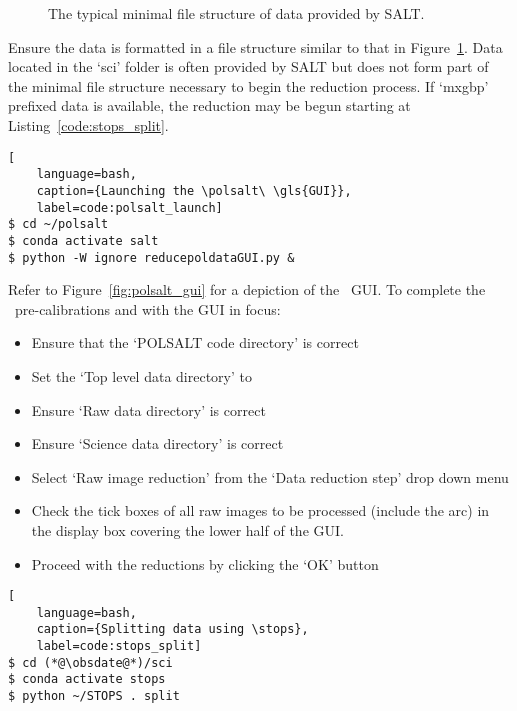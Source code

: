 \begin{figure}[h!]
    \centering
    \begin{minipage}{8cm}
    \end{minipage}
    \caption{The typical minimal file structure of data provided by \gls{SALT}.}
    \label{dir:pre_red}
\end{figure}

Ensure the data is formatted in a file structure similar to that in Figure~\ref{dir:pre_red}. Data located in the `sci' folder is often provided by \gls{SALT} but does not form part of the minimal file structure necessary to begin the reduction process. If `mxgbp' prefixed data is available, the reduction may be begun starting at Listing~\ref{code:stops_split}.

\begin{lstlisting}[
    language=bash,
    caption={Launching the \polsalt\ \gls{GUI}},
    label=code:polsalt_launch]
$ cd ~/polsalt
$ conda activate salt
$ python -W ignore reducepoldataGUI.py &
\end{lstlisting}

\noindent Refer to Figure~\ref{fig:polsalt_gui} for a depiction of the \polsalt\ \gls{GUI}. To complete the \polsalt\ pre-calibrations and with the \gls{GUI} in focus:
\begin{itemize}
    \item Ensure that the `POLSALT code directory' is correct
    \item Set the `Top level data directory' to \obsdate
    \item Ensure `Raw data directory' is correct
    \item Ensure `Science data directory' is correct
    \item Select `Raw image reduction' from the `Data reduction step' drop down menu
    \item Check the tick boxes of all raw images to be processed (include the arc) in the display box covering the lower half of the \gls{GUI}.
    \item Proceed with the reductions by clicking the `OK' button
\end{itemize}

\begin{lstlisting}[
    language=bash,
    caption={Splitting data using \stops},
    label=code:stops_split]
$ cd (*@\obsdate@*)/sci
$ conda activate stops
$ python ~/STOPS . split
\end{lstlisting}

